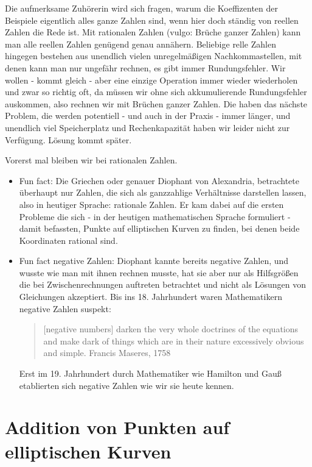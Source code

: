 \documentclass{article}
\begin{document}
Die aufmerksame Zuhörerin wird sich fragen, warum die Koeffizenten der
Beispiele eigentlich alles ganze Zahlen sind, wenn hier doch ständig von
reellen Zahlen die Rede ist. Mit rationalen Zahlen (vulgo: Brüche ganzer
Zahlen) kann man alle reellen Zahlen genügend genau annähern.
Beliebige relle Zahlen hingegen bestehen aus unendlich vielen unregelmäßigen
Nachkommastellen, mit denen kann man nur ungefähr rechnen, es gibt immer
Rundungsfehler. Wir wollen - kommt gleich - aber eine einzige Operation immer
wieder wiederholen und zwar so richtig oft, da müssen wir ohne sich
akkumulierende Rundungsfehler auskommen, also rechnen wir mit Brüchen ganzer
Zahlen. Die haben das nächste Problem, die werden potentiell - und auch in der
Praxis - immer länger, und unendlich viel Speicherplatz und Rechenkapazität
haben wir leider nicht zur Verfügung. Lösung kommt später.

Vorerst mal bleiben wir bei rationalen Zahlen.

\begin{itemize}
\item
  Fun fact: Die Griechen oder genauer Diophant von Alexandria, betrachtete
  überhaupt nur Zahlen, die sich als ganzzahlige Verhältnisse darstellen
  lassen, also in heutiger Sprache: rationale Zahlen. Er kam dabei auf die
  ersten Probleme die sich - in der heutigen mathematischen Sprache formuliert -
  damit befassten, Punkte auf elliptischen Kurven zu finden, bei denen beide
  Koordinaten rational sind.
\item
  Fun fact negative Zahlen: Diophant kannte bereits negative Zahlen,
  und wusste wie man mit ihnen rechnen musste, hat sie aber nur als
  Hilfsgrößen die bei Zwischenrechnungen auftreten betrachtet und
  nicht als Lösungen von Gleichungen akzeptiert. Bis
  ins 18. Jahrhundert waren Mathematikern negative Zahlen
  suspekt:
  \begin{quote}
    [negative numbers] darken the
  very whole doctrines of the equations and make dark of things which
  are in their nature excessively obvious and simple.
  \hfill Francis Maseres, 1758
  \end{quote}
  Erst im 19. Jahrhundert durch Mathematiker wie Hamilton und Gauß
  etablierten sich negative Zahlen wie wir sie heute kennen.
\end{itemize}

\section{Addition von Punkten auf elliptischen Kurven}
\end{document}
